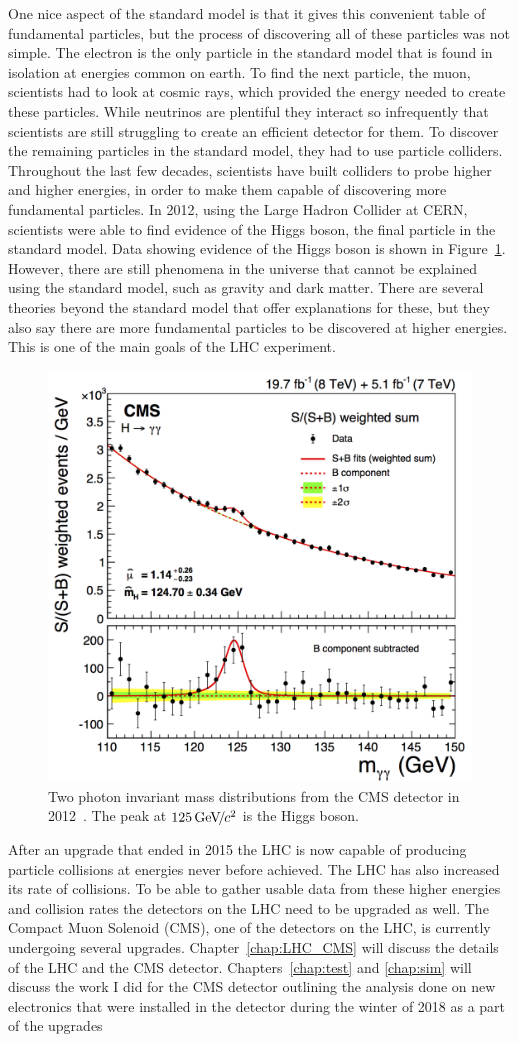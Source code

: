 One nice aspect of the standard model is that it gives this convenient table of fundamental particles, but the process of discovering all of these particles was not simple. The electron is the only particle in the standard model that is found in isolation at energies common on earth. To find the next particle, the muon, scientists had to look at cosmic rays, which provided the energy needed to create these particles. While neutrinos are plentiful they interact so infrequently that scientists are still struggling to create an efficient detector for them. To discover the remaining particles in the standard model, they had to use particle colliders. Throughout the last few decades, scientists have built colliders to probe higher and higher energies, in order to make them capable of discovering more fundamental particles. In 2012, using the Large Hadron Collider at CERN, scientists were able to find evidence of the Higgs boson, the final particle in the standard model. Data showing evidence of the Higgs boson is shown in Figure~\ref{fig:higgs}. However, there are still phenomena in the universe that cannot be explained using the standard model, such as gravity and dark matter. There are several theories beyond the standard model that offer explanations for these, but they also say there are more fundamental particles to be discovered at higher energies. This is one of the main goals of the LHC experiment. 

\begin{figure}
\centering
\includegraphics[width=0.6\linewidth]{Figures/higgsmeasurement.png}
\caption{Two photon invariant mass distributions from the CMS detector in 2012~\cite{CMS_Higgs_Discovery}. The peak at $125{\,\text{Ge\hspace{-.08em}V\hspace{-0.16em}/\hspace{-0.08em}}c^\text{2}}$ is the Higgs boson.}
\label{fig:higgs}
\end{figure} 


After an upgrade that ended in 2015 the LHC is now capable of producing particle collisions at energies never before achieved. The LHC has also increased its rate of collisions. To be able to gather usable data from these higher energies and collision rates the detectors on the LHC need to be upgraded as well. The Compact Muon Solenoid (CMS), one of the detectors on the LHC, is currently undergoing several upgrades. Chapter~\ref{chap:LHC_CMS} will discuss the details of the LHC and the CMS detector. Chapters~\ref{chap:test} and \ref{chap:sim} will discuss the work I did for the CMS detector outlining the analysis done on new electronics that were installed in the detector during the winter of 2018 as a part of the upgrades

